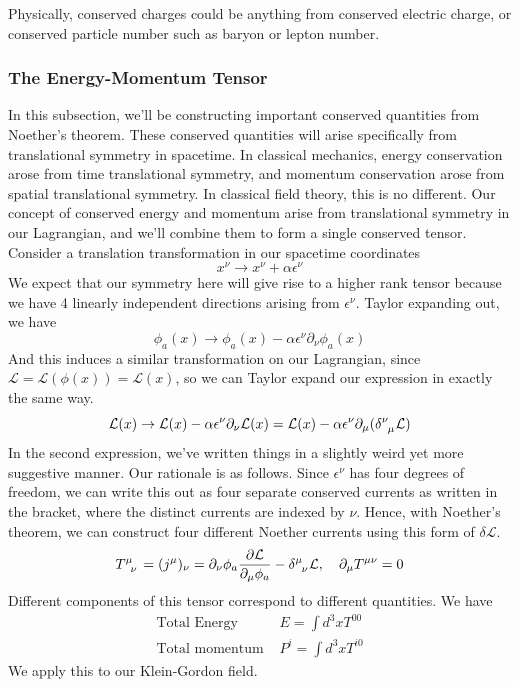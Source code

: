 \documentclass[11pt, oneside]{article}   	%
\theoremstyle{newline}
\theoremstyle{newline}
\theoremstyle{newline}
\theoremstyle{newline}
\theoremstyle{newline}
\newcommand{\Lagr}{\mathcal{L}}
\begin{document}
Physically, conserved charges could be anything from conserved electric charge, or conserved particle number such as baryon or lepton number. 
\subsubsection{The Energy-Momentum Tensor} 
In this subsection, we'll be constructing important conserved quantities from Noether's theorem. These conserved quantities will arise specifically from translational symmetry in spacetime. In classical mechanics, energy conservation arose from time translational symmetry, and momentum conservation arose from spatial translational symmetry. In classical field theory, this is no different. Our concept of conserved energy and momentum arise from translational symmetry in our Lagrangian, and we'll combine them to form a single conserved tensor. 
Consider a translation transformation in our spacetime coordinates 
\[
x^\nu \rightarrow x^\nu + \alpha \epsilon^\nu 
\]
We expect that our symmetry here will give rise to a higher rank tensor because we have 4 linearly independent directions arising from $\epsilon^\nu$. Taylor expanding out, we have 
\[
\phi_a(x) \rightarrow \phi_a(x) - \alpha \epsilon^\nu\partial_\nu \phi_a(x)
\]
And this induces a similar transformation on our Lagrangian, since $\mathcal{L} = \mathcal{L} (\phi ( x))  = \mathcal{L}( x)$, so we can Taylor expand our expression in exactly the same way. 
\[ 
\Lagr(x) \rightarrow \Lagr(x)  - \alpha \epsilon^\nu\partial_\nu \Lagr(x) = \Lagr(x) - \alpha \epsilon^\nu \partial_\mu (\delta\indices{^\nu_\mu}\mathcal{L} ) 
\]
In the second expression, we've written things in a slightly weird yet more suggestive manner. Our rationale is as follows. Since $\epsilon^\nu$ has four degrees of freedom, we can write this out as four separate conserved currents as written in the bracket, where the distinct currents are indexed by $\nu$. 
Hence, with Noether's theorem, we can construct four different Noether currents using this form of $\delta \mathcal{L}$. 
\[ 
T\indices{^\mu_\nu} = (j^\mu)_\nu = \partial_\nu \phi_a \frac{ \partial \Lagr }{ \partial_\mu \phi_a}  - \delta\indices{^\mu_\nu}\mathcal{L} , \quad \partial_\mu T^{\mu \nu} = 0 
\] 
Different components of this tensor correspond to different quantities. We have 
\begin{align*} 
\text{Total Energy } & E = \int d^ 3 x T^{ 00} \\
\text{Total momentum } & P^i = \int d^3 x T^{ i0 } 
\end{align*} 
We apply this to our Klein-Gordon field. 
\end{document}
